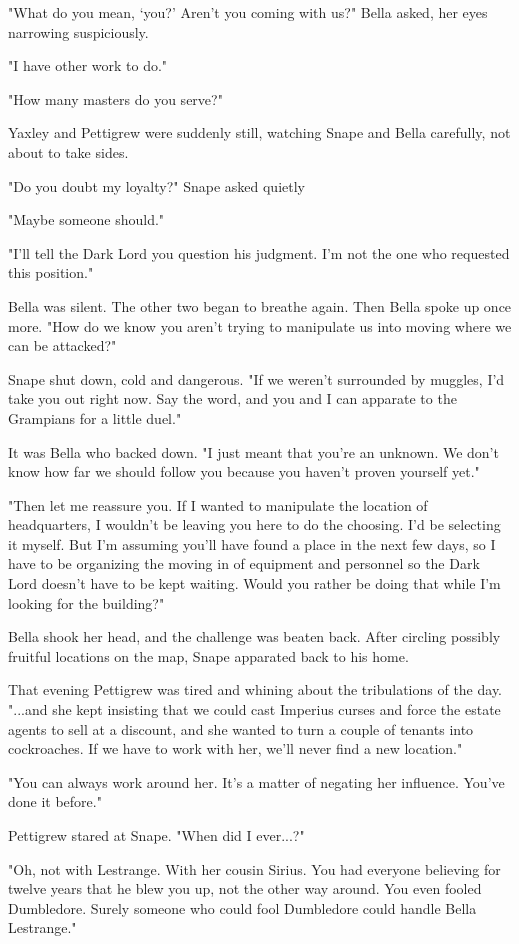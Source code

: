 \documentclass[a4paper,11pt]{article}
\begin{document}
"What do you mean, `you?' Aren't you coming with us?" Bella asked, her eyes narrowing suspiciously.

"I have other work to do."

"How many masters do you serve?"

Yaxley and Pettigrew were suddenly still, watching Snape and Bella carefully, not about to take sides.

"Do you doubt my loyalty?" Snape asked quietly

"Maybe someone should."

"I'll tell the Dark Lord you question his judgment. I'm not the one who requested this position."

Bella was silent. The other two began to breathe again. Then Bella spoke up once more. "How do we know you aren't trying to manipulate us into moving where we can be attacked?"

Snape shut down, cold and dangerous. "If we weren't surrounded by muggles, I'd take you out right now. Say the word, and you and I can apparate to the Grampians for a little duel."

It was Bella who backed down. "I just meant that you're an unknown. We don't know how far we should follow you because you haven't proven yourself yet."

"Then let me reassure you. If I wanted to manipulate the location of headquarters, I wouldn't be leaving you here to do the choosing. I'd be selecting it myself. But I'm assuming you'll have found a place in the next few days, so I have to be organizing the moving in of equipment and personnel so the Dark Lord doesn't have to be kept waiting. Would you rather be doing that while I'm looking for the building?"

Bella shook her head, and the challenge was beaten back. After circling possibly fruitful locations on the map, Snape apparated back to his home.

That evening Pettigrew was tired and whining about the tribulations of the day. "...and she kept insisting that we could cast Imperius curses and force the estate agents to sell at a discount, and she wanted to turn a couple of tenants into cockroaches. If we have to work with her, we'll never find a new location."

"You can always work around her. It's a matter of negating her influence. You've done it before."

Pettigrew stared at Snape. "When did I ever...?"

"Oh, not with Lestrange. With her cousin Sirius. You had everyone believing for twelve years that he blew you up, not the other way around. You even fooled Dumbledore. Surely someone who could fool Dumbledore could handle Bella Lestrange."
\end{document}
